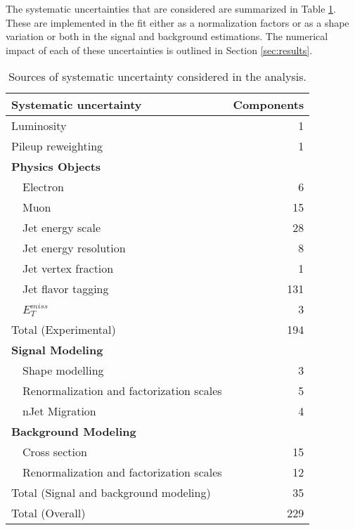 
The systematic uncertainties that are considered are summarized in Table \ref{tab:SystSummary}. These are implemented in the fit either as a normalization factors or as a shape variation or both in the signal and background estimations. The numerical impact of each of these uncertainties is outlined in Section \ref{sec:results}.

\begin{table}[H]
\centering
\caption{Sources of systematic uncertainty considered in the analysis.}
\begin{tabular}{lr}
\hline\hline
Systematic uncertainty & Components  	      \\
\hline
\hline
Luminosity	& 1		      \\
Pileup reweighting 	& 1		      \\
\textbf {Physics Objects}     	&		      \\
\ \ Electron                               	& 6		      \\
\ \ Muon	& 15		      \\
\ \ Jet energy scale   	& 28                  \\
\ \ Jet energy resolution & 8 \\
\ \ Jet vertex fraction  	& 1		      \\
\ \ Jet flavor tagging   	& 131		      \\
\ \ $E^{miss}_T$  	& 3		      \\
\hline
Total (Experimental)        & 194		     \\
\hline
\hline
\textbf {Signal Modeling}           &                     \\
\ \ Shape modelling & 3 \\
\ \ Renormalization and factorization scales    & 5                  \\
\ \ nJet Migration & 4 \\
\textbf {Background Modeling}          	&		      \\
\ \ Cross section                 	& 15		      \\
\ \ Renormalization and factorization scales 	& 12		      \\
\hline
Total (Signal and background modeling)       &  35		     \\
\hline\hline
Total (Overall)                             & 229	      \\
\hline\hline
\end{tabular}
\label{tab:SystSummary}
\end{table}


